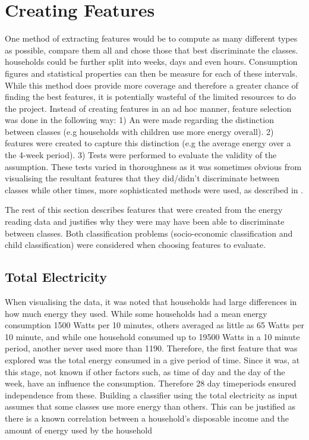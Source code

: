 \section{Creating Features}
One method of extracting features would be to compute as many different types as possible, compare them all and chose those that best discriminate the classes. households could be further split into weeks, days and even hours. Consumption figures and statistical properties can then be measure for each of these intervals. While this method does provide more coverage and therefore a greater chance of finding the best features, it is potentially wasteful of the limited resources to do the project. Instead of creating features in an ad hoc manner, feature selection was done in the following way: 1) An were made regarding the distinction between classes (e.g households with children use more energy overall). 2) features were created to capture this distinction (e.g the average energy over a the 4-week period). 3) Tests were performed to evaluate the validity of the assumption. These tests varied in thoroughness as it was sometimes obvious from visualising the resultant features that they did/didn't discriminate between classes while other times, more sophisticated methods were used, as described in \featureSelectionSection.
\linebreak

The rest of this section describes features that were created from the energy reading data and justifies why they were may have been able to discriminate between classes. Both classification problems (socio-economic classification and child classification) were considered when choosing features to evaluate.

\subsection{Total Electricity}
When visualising the data, it was noted that households had large differences in how much energy they used. While some households had a mean energy consumption 1500 Watts per 10 minutes, others averaged as little as 65 Watts per 10 minute, and while one household consumed up to 19500 Watts in a 10 minute period, another never used more than 1190. Therefore, the first feature that was explored was the total energy consumed in a give period of time. Since it was, at this stage, not known if other factors such, as time of day and the day of the week, have an influence the consumption. Therefore 28 day timeperiods ensured independence from these.
Building a classifier using the total electricity as input assumes that some classes use more energy than others. This can be justified as there is a known correlation between a household's disposable income and the amount of energy used by the household \cite{Gomez}

